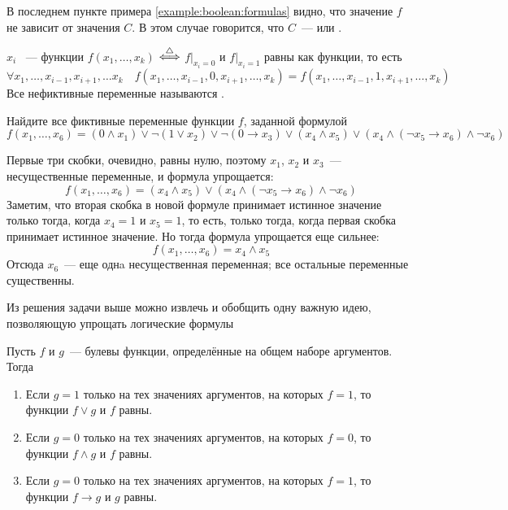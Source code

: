 В последнем пункте примера \ref{example:boolean:formulas} видно, что значение $ f $ не зависит от значения $ C $.
В этом случае говорится, что $ C $~---  или .

\begin{definition}
    $ x_i $ ~---  функции $ f(x_1, \ldots, x_k) $ $ \overset{\triangle}{\Longleftrightarrow} $ $ f \big|_{x_i = 0} $ и $ f \big|_{x_i = 1} $ равны как функции,
    то есть
    \[
        \forall x_1, \ldots, x_{i-1}, x_{i+1}, \ldots x_k \quad f(x_1, \ldots, x_{i-1}, 0, x_{i+1}, \ldots, x_k) = f(x_1, \ldots, x_{i-1}, 1, x_{i+1}, \ldots, x_k)
    \]
    Все нефиктивные переменные называются .
\end{definition}


\begin{Exercise}[counter=SecExercise, label={ex:boolean:insignificant_variables}]
    \noindent
    Найдите все фиктивные переменные функции $ f $, заданной формулой
    \[
        f(x_1, \ldots, x_6) = (0 \wedge x_1) \vee \neg (1 \vee x_2) \vee \neg (0 \rightarrow x_3) \vee (x_4 \wedge x_5) \vee (x_4 \wedge (\neg x_5 \rightarrow x_6) \wedge \neg x_6)
    \]
\end{Exercise}

\begin{Answer}
    \noindent
    Первые три скобки, очевидно, равны нулю, поэтому $ x_1 $, $ x_2 $ и $ x_3 $~--- несущественные переменные, и формула упрощается:
    \[
        f(x_1, \ldots, x_6) = (x_4 \wedge x_5) \vee (x_4 \wedge (\neg x_5 \rightarrow x_6) \wedge \neg x_6)
    \]
    Заметим, что вторая скобка в новой формуле принимает истинное значение только тогда, когда $ x_4 = 1 $ и $ x_5 = 1 $,
    то есть, только тогда, когда первая скобка принимает истинное значение.
    Но тогда формула упрощается еще сильнее:
    \[
        f(x_1, \ldots, x_6) = x_4 \wedge x_5
    \]
    Отсюда $ x_6 $~--- еще однa несущественная переменная;
    все остальные переменные существенны.
\end{Answer}




Из решения задачи выше можно извлечь и обобщить одну важную идею, позволяющую упрощать логические формулы
\begin{lemma}
    Пусть $ f $ и $ g $~--- булевы функции, определённые на общем наборе аргументов.
    Тогда
    \begin{enumerate}[label=\arabic*)]
        \item Если $ g = 1 $ только на тех значениях аргументов, на которых $ f = 1 $, то функции $ f \vee g $ и $ f $ равны.
        \item Если $ g = 0 $ только на тех значениях аргументов, на которых $ f = 0 $, то функции $ f \wedge g $ и $ f $ равны.
        \item Если $ g = 0 $ только на тех значениях аргументов, на которых $ f = 1 $, то функции $ f \rightarrow g $ и $ g $ равны.
    \end{enumerate}
\end{lemma}

